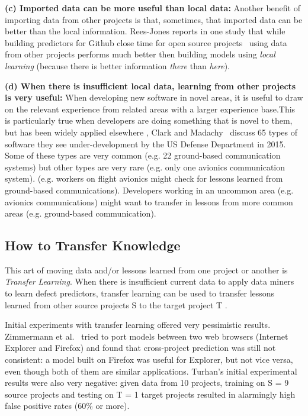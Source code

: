 \documentclass[10pt,journal,compsoc]{IEEEtran}
\begin{document}
\textbf{(c) Imported data can be more useful than local data:} Another benefit of  importing data from other projects is that, sometimes, that imported data can be better than the local information. Rees-Jones reports in one study that while building predictors
for Github close time  for open source projects~\cite{rees2017better} using data from other projects performs much better then building models using {\em local learning} (because there is better  information {\em there} than {\em here}).


\textbf{(d) When there is insufficient local data, learning from other projects is very useful:} When developing new software in  novel areas, it is useful to draw on the relevant  experience  from related areas with a larger experience base.This is particularly true when developers are doing something that is novel to them, but has been widely applied elsewhere
, Clark and Madachy~\cite{clark15} discuss 65 types of software they see        under-development by the US Defense Department in 2015.   Some of these types are very common (e.g. 22 ground-based communication systems) but other types are very rare (e.g. only  one avionics communication system). (e.g. workers on   flight avionics   might check for lessons learned from ground-based communications). Developers  working in an uncommon area (e.g. avionics communications) might want to transfer in lessons from more common areas (e.g. ground-based communication).

\subsection{ How to  Transfer Knowledge}
This     art of moving data and/or lessons learned from one project or another is {\em Transfer Learning}. When there is insufficient current data to apply data miners to learn defect predictors, transfer learning can be used to transfer lessons learned from other source projects S to the target project T .

Initial experiments with transfer learning offered very pessimistic results. Zimmermann et al.~\cite{zimmermann2009cross} tried to port models between two web browsers (Internet Explorer and Firefox) and found that cross-project prediction was still not consistent: a model built on Firefox was useful for Explorer, but not vice versa, even though both of them are similar applications. Turhan's initial experimental results were also very negative: given data from 10 projects, training on S = 9 source projects and testing on T = 1 target projects resulted in alarmingly high false positive rates (60\% or more). 
\end{document}
